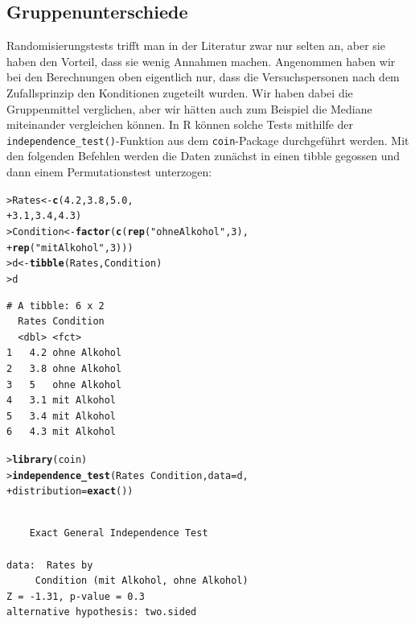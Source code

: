 \documentclass[oneside, 10pt]{book}\usepackage[]{graphicx}\usepackage[]{xcolor}
\makeatletter
\newcommand{\hlnum}[1]{\textcolor[rgb]{0.686,0.059,0.569}{#1}}%
\newcommand{\hlstr}[1]{\textcolor[rgb]{0.192,0.494,0.8}{#1}}%
\newcommand{\hlopt}[1]{\textcolor[rgb]{0,0,0}{#1}}%
\newcommand{\hlstd}[1]{\textcolor[rgb]{0.345,0.345,0.345}{#1}}%
\newcommand{\hlkwb}[1]{\textcolor[rgb]{0.69,0.353,0.396}{#1}}%
\newcommand{\hlkwc}[1]{\textcolor[rgb]{0.333,0.667,0.333}{#1}}%
\newcommand{\hlkwd}[1]{\textcolor[rgb]{0.737,0.353,0.396}{\textbf{#1}}}%
\newenvironment{kframe}{%
 \def\at@end@of@kframe{}%
 \ifinner\ifhmode%
  \def\at@end@of@kframe{\end{minipage}}%
  \begin{minipage}{\columnwidth}%
 \fi\fi%
 \def\FrameCommand##1{\hskip\@totalleftmargin \hskip-\fboxsep
 \colorbox{shadecolor}{##1}\hskip-\fboxsep
     \hskip-\linewidth \hskip-\@totalleftmargin \hskip\columnwidth}%
 \MakeFramed {\advance\hsize-\width
   \@totalleftmargin\z@ \linewidth\hsize
   \@setminipage}}%
 {\par\unskip\endMakeFramed%
 \at@end@of@kframe}
\newenvironment{knitrout}{}{} %
\makeatother
\begin{document}
\subsection{Gruppenunterschiede}
Randomisierungstests trifft man in der Literatur zwar nur selten an,
aber sie haben den Vorteil, dass sie wenig Annahmen machen.
Angenommen haben wir bei den Berechnungen oben eigentlich nur,
dass die Versuchspersonen nach dem Zufallsprinzip den
Konditionen zugeteilt wurden. Wir haben dabei die Gruppenmittel
verglichen, aber wir hätten auch zum Beispiel die Mediane miteinander
vergleichen können.
In R können solche Tests mithilfe der \texttt{independence\_test()}-Funktion
aus dem \texttt{coin}-Package durchgeführt werden.
Mit den folgenden Befehlen werden die Daten zunächst in einen tibble gegossen
und dann einem Permutationstest unterzogen:
\begin{knitrout}
\color{fgcolor}\begin{kframe}
\begin{alltt}
\hlstd{> }\hlstd{Rates} \hlkwb{<-} \hlkwd{c}\hlstd{(}\hlnum{4.2}\hlstd{,} \hlnum{3.8}\hlstd{,} \hlnum{5.0}\hlstd{,}
\hlstd{+ }           \hlnum{3.1}\hlstd{,} \hlnum{3.4}\hlstd{,} \hlnum{4.3}\hlstd{)}
\hlstd{> }\hlstd{Condition} \hlkwb{<-} \hlkwd{factor}\hlstd{(}\hlkwd{c}\hlstd{(}\hlkwd{rep}\hlstd{(}\hlstr{"ohne Alkohol"}\hlstd{,} \hlnum{3}\hlstd{),}
\hlstd{+ }                      \hlkwd{rep}\hlstd{(}\hlstr{"mit Alkohol"}\hlstd{,} \hlnum{3}\hlstd{)))}
\hlstd{> }\hlstd{d} \hlkwb{<-} \hlkwd{tibble}\hlstd{(Rates, Condition)}
\hlstd{> }\hlstd{d}
\end{alltt}
\begin{verbatim}
# A tibble: 6 x 2
  Rates Condition   
  <dbl> <fct>       
1   4.2 ohne Alkohol
2   3.8 ohne Alkohol
3   5   ohne Alkohol
4   3.1 mit Alkohol 
5   3.4 mit Alkohol 
6   4.3 mit Alkohol 
\end{verbatim}
\begin{alltt}
\hlstd{> }\hlkwd{library}\hlstd{(coin)}
\hlstd{> }\hlkwd{independence_test}\hlstd{(Rates} \hlopt{~} \hlstd{Condition,} \hlkwc{data} \hlstd{= d,}
\hlstd{+ }                  \hlkwc{distribution} \hlstd{=} \hlkwd{exact}\hlstd{())}
\end{alltt}
\begin{verbatim}

	Exact General Independence Test

data:  Rates by
	 Condition (mit Alkohol, ohne Alkohol)
Z = -1.31, p-value = 0.3
alternative hypothesis: two.sided
\end{verbatim}
\end{kframe}
\end{knitrout}
\end{document}
